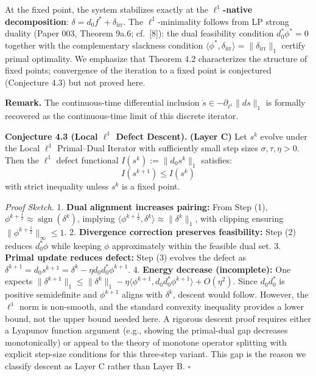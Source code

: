 \documentclass[
]{article}
\begin{document}
At the fixed point, the system stabilizes exactly at the
\textbf{\(\ell^1\)-native decomposition}:
\(\delta = d_0 f^* + \delta_{\mathrm{irr}}\). The \(\ell^1\)-minimality
follows from LP strong duality (Paper 003, Theorem 9a.6; cf.~{[}8{]}):
the dual feasibility condition \(d_0^* \phi^* = 0\) together with the
complementary slackness condition
\(\langle \phi^*, \delta_{\mathrm{irr}} \rangle = \|\delta_{\mathrm{irr}}\|_1\)
certify primal optimality. We emphasize that Theorem 4.2 characterizes
the structure of fixed points; convergence of the iteration to a fixed
point is conjectured (Conjecture 4.3) but not proved here.

\textbf{Remark.} The continuous-time differential inclusion
\(\dot{s} \in -\partial_{\ell^1} \|ds\|_1\) is formally recovered as the
continuous-time limit of this discrete iterator.

\textbf{Conjecture 4.3 (Local \(\ell^1\) Defect Descent).}
\textbf{(Layer C)} Let \(s^k\) evolve under the Local \(\ell^1\)
Primal--Dual Iterator with sufficiently small step sizes
\(\sigma, \tau, \eta > 0\). Then the \(\ell^1\) defect functional
\(I(s^k) := \|d_0 s^k\|_1\) satisfies: \[ I(s^{k+1}) \le I(s^k) \] with
strict inequality unless \(s^k\) is a fixed point.

\emph{Proof Sketch.} 1. \textbf{Dual alignment increases pairing:} From
Step (1),
\(\phi^{k+\frac{1}{2}} \approx \operatorname{sign}(\delta^k)\), implying
\(\langle \phi^{k+\frac{1}{2}}, \delta^k \rangle \approx \|\delta^k\|_1\),
with clipping ensuring \(\|\phi^{k+\frac{1}{2}}\|_\infty \le 1\). 2.
\textbf{Divergence correction preserves feasibility:} Step (2) reduces
\(d_0^* \phi\) while keeping \(\phi\) approximately within the feasible
dual set. 3. \textbf{Primal update reduces defect:} Step (3) evolves the
defect as
\(\delta^{k+1} = d_0 s^{k+1} = \delta^k - \eta d_0 d_0^* \phi^{k+1}\).
4. \textbf{Energy decrease (incomplete):} One expects
\(\|\delta^{k+1}\|_1 \le \|\delta^k\|_1 - \eta \langle \phi^{k+1}, d_0 d_0^* \phi^{k+1} \rangle + O(\eta^2)\).
Since \(d_0 d_0^*\) is positive semidefinite and \(\phi^{k+1}\) aligns
with \(\delta^k\), descent would follow. However, the \(\ell^1\) norm is
non-smooth, and the standard convexity inequality provides a lower
bound, not the upper bound needed here. A rigorous descent proof
requires either a Lyapunov function argument (e.g., showing the
primal-dual gap decreases monotonically) or appeal to the theory of
monotone operator splitting with explicit step-size conditions for this
three-step variant. This gap is the reason we classify descent as Layer
C rather than Layer B. \(\square\)
\end{document}
